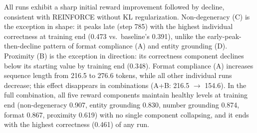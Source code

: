 All runs exhibit a sharp initial reward improvement followed by decline, consistent with REINFORCE without KL regularization.
Non-degeneracy (C) is the exception in shape: it peaks late (step 785) with the highest individual correctness at training end (0.473 vs.\ baseline's 0.391), unlike the early-peak-then-decline pattern of format compliance (A) and entity grounding (D).
Proximity (B) is the exception in direction: its correctness component declines below its starting value by training end (0.348).
Format compliance (A) increases sequence length from 216.5 to 276.6 tokens, while all other individual runs decrease; this effect disappears in combinations (A+B: 216.5 $\to$ 154.6).
In the full combination, all five reward components maintain healthy levels at training end (non-degeneracy 0.907, entity grounding 0.830, number grounding 0.874, format 0.867, proximity 0.619) with no single component collapsing, and it ends with the highest correctness (0.461) of any run.

\nestunindent
\nestunindent
